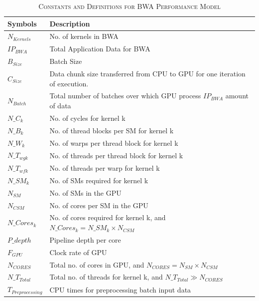 \documentclass[conference]{IEEEtran}
\begin{document}
\begin{table}[!t]
\renewcommand{\arraystretch}{1.3}
\caption{\textsc{Constants and Definitions for BWA Performance Model}}
\label{table2}
\centering
\scalebox{0.8}
{
\begin{tabular}{| l | >{\arraybackslash}m{2.5in} |}
\hline
\textbf{Symbols} & \textbf{Description}\\
\hline
$N_{Kernels}$ & No. of kernels in BWA \\
\hline
$IP_{BWA}$ & Total Application Data for BWA \\
\hline
$B_{Size}$ & Batch Size \\
\hline
$C_{Size}$ & Data chunk size transferred from CPU to GPU for one iteration of execution. \\
\hline
$N_{Batch}$ & Total number of batches over which GPU process $IP_{BWA}$ amount of data \\
\hline
$N\_C_k$ & No. of cycles for kernel k\\
\hline
$N\_B_k$ & No. of thread blocks per SM for kernel k\\
\hline
$N\_W_k$ & No. of warps per thread block for kernel k\\
\hline
$N\_T_{wgk}$ & No. of threads per thread block for kernel k\\
\hline
$N\_T_{wfk}$ & No. of threads per warp for kernel k\\
\hline
$N\_SM_k$ & No. of SMs required for kernel k\\
\hline
$N_{SM}$ & No. of SMs in the GPU\\
\hline
$N_{CSM}$ & No. of cores per SM in the GPU\\
\hline
$N\_Cores_k$ & No. of cores required for kernel k, and $N\_Cores_k = N\_SM_k \times N_{CSM}$\\
\hline
$P\_depth$ & Pipeline depth per core\\
\hline
$F_{GPU}$ & Clock rate of GPU\\
\hline
$N_{CORES}$ & Total no. of cores in GPU, and $N_{CORES} = N_{SM} \times N_{CSM}$\\
\hline
$N\_T_{Total}$ & Total no. of threads for kernel k, and $N\_T_{Total} \gg N_{CORES}$\\
\hline
$T_{Preprocessing}$ & CPU times for preprocessing batch input data\\

\end{tabular}}
\end{table}
\end{document}

